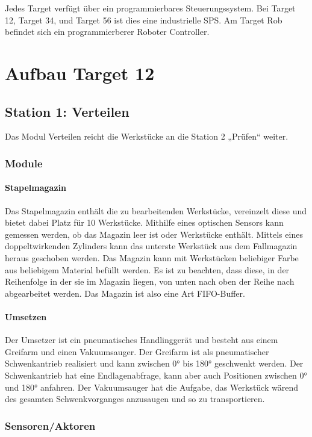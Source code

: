 \documentclass[11pt,a4paper,ngerman]{article}
\begin{document}
Jedes Target verfügt über ein programmierbares Steuerungssystem. Bei Target 12, Target 34, und Target 56 ist dies eine industrielle SPS. Am Target Rob befindet sich ein programmierberer Roboter Controller.


\section{Aufbau Target 12}

\subsection{Station 1: Verteilen}\label{station_verteilen}
Das Modul Verteilen reicht die Werkstücke an die Station 2 „Prüfen“ weiter.

\subsubsection{Module}

\paragraph{Stapelmagazin}
Das Stapelmagazin enthält die zu bearbeitenden Werkstücke, vereinzelt diese und bietet dabei Platz für 10 Werkstücke. Mithilfe eines optischen Sensors kann gemessen werden, ob das Magazin leer ist oder Werkstücke enthält. Mittels eines doppeltwirkenden Zylinders kann das unterste Werkstück aus dem Fallmagazin heraus geschoben werden. Das Magazin kann mit Werkstücken beliebiger Farbe aus beliebigem Material befüllt werden. Es ist zu beachten, dass diese, in der Reihenfolge in der sie im Magazin liegen, von unten nach oben der Reihe nach abgearbeitet werden. Das Magazin ist also eine Art FIFO-Buffer.

\paragraph{Umsetzen}
Der Umsetzer ist ein pneumatisches Handlinggerät und besteht aus einem Greifarm und einen Vakuumsauger. Der Greifarm ist als pneumatischer Schwenkantrieb realisiert und kann zwischen 0° bis 180° geschwenkt werden. Der Schwenkantrieb hat eine Endlagenabfrage, kann aber auch Positionen zwischen 0° und 180° anfahren. Der Vakuumsauger hat die Aufgabe, das Werkstück wärend des gesamten Schwenkvorganges anzusaugen und so zu transportieren.


\subsubsection{Sensoren/Aktoren}
\end{document}
